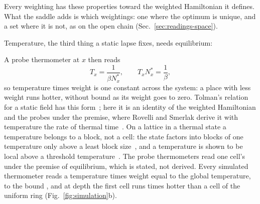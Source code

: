 \documentclass[aps,prd,reprint,superscriptaddress]{revtex4-2}
\begin{document}
Every weighting has these properties toward the weighted Hamiltonian it defines. What the saddle adds is which weightings: one where the optimum is unique, and a set where it is not, as on the open chain (Sec.~\ref{sec:readings-space}).

Temperature, the third thing a static lapse fixes, needs equilibrium:


A probe thermometer at $x$ then reads
\begin{equation}
  T_x = \frac{1}{\beta N^*_x}, \qquad T_x N^*_x = \frac{1}{\beta},
  \label{eq:tolman}
\end{equation}
so temperature times weight is one constant across the system: a place with less weight runs hotter, without bound as its weight goes to zero. Tolman's relation for a static field has this form~\cite{Tolman1930}; here it is an identity of the weighted Hamiltonian and the probes under the premise, where Rovelli and Smerlak derive it with temperature the rate of thermal time~\cite{RovelliSmerlak2011}. On a lattice in a thermal state a temperature belongs to a block, not a cell: the state factors into blocks of one temperature only above a least block size~\cite{HartmannMahlerHess2004}, and a temperature is shown to be local above a threshold temperature~\cite{KlieschEtAl2014}. The probe thermometers read one cell's under the premise of equilibrium, which is stated, not derived. Every simulated thermometer reads a temperature times weight equal to the global temperature, to the bound , and at depth  the first cell runs  times hotter than a cell of the uniform ring (Fig.~\ref{fig:simulation}b).
\end{document}
